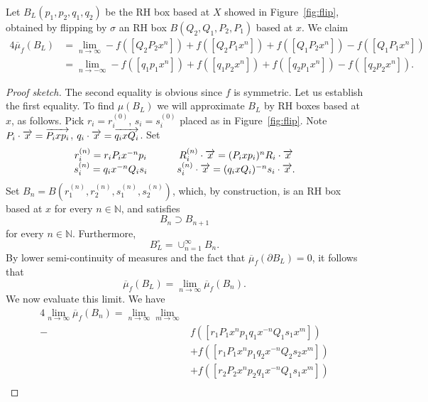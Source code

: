 \begin{lemma}
\label{lem:RH_flip_invariance}
Let $B_L(p_1,p_2,q_1,q_2)$ be the RH box based at $X$ showed in Figure~\ref{fig:flip}, obtained by flipping by $\sigma$ an RH box $B(Q_2,Q_1,P_2,P_1)$ based at $x$. We claim
\begin{equation}
\begin{aligned}
4\overline \mu_f(B_L) &=\lim_{n \to \infty}
-f([Q_2P_2 x^n]) + f([Q_2P_1x^n])+f([Q_1P_2x^n])-f([Q_1P_1x^n])\\&=
\lim_{n \to -\infty} -f([q_1p_1x^n]) + f([q_1p_2x^n]) + f([q_2p_1x^n]) - f([q_2p_2x^n]).
\end{aligned}
\label{eq:LH}
\end{equation}
\end{lemma}
\begin{proof}[Proof sketch]
The second equality is obvious since $f$ is symmetric. Let us establish the first equality.
To find $\mu(B_L)$ we will approximate $B_L$ by RH boxes based at $x$, as follows.
Pick $r_i =r_i^{(0)}$, $s_i=s_i^{(0)}$ placed as in Figure~\ref{fig:flip}.
Note $P_i \cdot \overrightarrow{x}=\overrightarrow{P_i x p_i}$, $q_i \cdot \overrightarrow{x} = \overrightarrow{q_i x Q_i}$.
Set
\begin{equation}
\begin{matrix}
r_i^{(n)}=r_i P_i x^{-n} p_i & \quad & R_i^{(n)} \cdot \overrightarrow{x} =(P_i x p_i)^{n} R_i \cdot \overrightarrow{x} \\
s_i^{(n)}=q_i x^{-n} Q_i s_i & \quad & s_i^{(n)} \cdot \overrightarrow{x} =(q_i x Q_i)^{-n} s_i \cdot \overrightarrow{x}.
\end{matrix}
\end{equation}
Set $B_n =B(r_1^{(n)},r_2^{(n)}, s_1^{(n)}, s_2^{(n)})$, which, by construction, is an RH box based at $x$ for every $n \in \mathbb{N}$, and satisfies
\[
B_{n} \supset B_{n+1}
\]
for every $n \in \mathbb{N}$.
Furthermore,
\[
B_L^\circ=\cup_{n=1}^{\infty} B_n.
\]
By lower semi-continuity of measures and the fact that  $\overline \mu_f(\partial B_L)=0$, it follows that
\[
\overline \mu_f(B_L) = \lim_{n \to \infty} \overline \mu_f(B_n).
\]
We now evaluate this limit. We have
\begin{equation}
\begin{aligned}
4\lim_{n \to \infty} \overline \mu_f(B_n) =
\lim_{n \to \infty} \lim_{m \to \infty}\\ -&f([r_1P_1x^{n}p_1 q_1x^{-n}Q_1s_1x^m])\\
& +f([r_1P_1x^{n}p_1 q_2x^{-n}Q_2s_2x^m])\\
& +f([r_2P_2x^{n}p_2 q_1x^{-n}Q_1s_1x^m])\\

\end{aligned}
\end{equation}
\end{proof}
